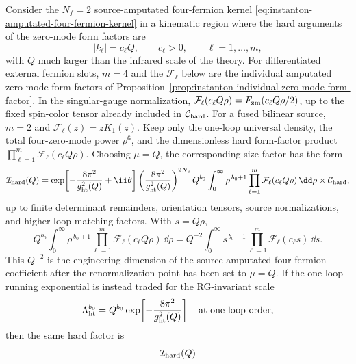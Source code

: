 \begin{controlledapproximation}
\label{ca:hard-momentum-instanton-size-window}
Consider the \(N_f=2\) source-amputated four-fermion kernel
\eqref{eq:instanton-amputated-four-fermion-kernel} in a kinematic region
where the hard arguments of the zero-mode form factors are
\[
  |k_\ell|=c_\ell Q,
  \qquad c_\ell>0,\qquad \ell=1,\ldots,m,
\]
with \(Q\) much larger than the infrared scale of the theory.  For
differentiated external fermion slots, \(m=4\) and the
\(\mathcal F_\ell\) below are the individual amputated zero-mode form factors
of Proposition~\ref{prop:instanton-individual-zero-mode-form-factor}.  In the
singular-gauge normalization,
\(\mathcal F_\ell(c_\ell Q\rho)=F_{\rm zm}(c_\ell Q\rho/2)\), up to the
fixed spin-color tensor already included in \(\mathcal C_{\rm hard}\).
For a fused bilinear source, \(m=2\) and
\(\mathcal F_\ell(z)=zK_1(z)\).  Keep only the one-loop universal density, the
total four-zero-mode power \(\rho^6\), and the dimensionless hard form-factor
product \(\prod_{\ell=1}^m\mathcal F_\ell(c_\ell Q\rho)\).  Choosing
\(\mu=Q\), the corresponding size factor has the form
\begin{equation}
  \mathcal I_{\rm hard}(Q)
  =
  \exp\!\left[-\frac{8\pi^2}{g_{\rm ht}^2(Q)}+\ii\theta\right]
  \left(\frac{8\pi^2}{g_{\rm ht}^2(Q)}\right)^{2N_c}
  Q^{b_0}
  \int_0^\infty
  \rho^{\,b_0+1}
  \prod_{\ell=1}^{m}
  \mathcal F_\ell(c_\ell Q\rho)\,\dd\rho
  \times\mathcal C_{\rm hard},
  \label{eq:hard-momentum-instanton-size-factor}
\end{equation}
up to finite determinant remainders, orientation tensors, source
normalizations, and higher-loop matching factors.  With \(s=Q\rho\),
\begin{equation}
  Q^{b_0}
  \int_0^\infty
  \rho^{\,b_0+1}
  \prod_{\ell=1}^{m}
  \mathcal F_\ell(c_\ell Q\rho)\,\dd\rho
  =
  Q^{-2}
  \int_0^\infty
  s^{\,b_0+1}
  \prod_{\ell=1}^{m}
  \mathcal F_\ell(c_\ell s)\,\dd s .
  \label{eq:hard-momentum-instanton-size-scaling}
\end{equation}
This \(Q^{-2}\) is the engineering dimension of the source-amputated
four-fermion coefficient after the renormalization point has been set to
\(\mu=Q\).  If the one-loop running exponential is instead traded for the
RG-invariant scale
\[
  \Lambda_{\rm ht}^{b_0}
  =
  Q^{b_0}
  \exp\!\left[-\frac{8\pi^2}{g_{\rm ht}^2(Q)}\right]
  \quad\hbox{at one-loop order},
\]
then the same hard factor is
\begin{equation}
  \mathcal I_{\rm hard}(Q)

\end{equation}
\end{controlledapproximation}
